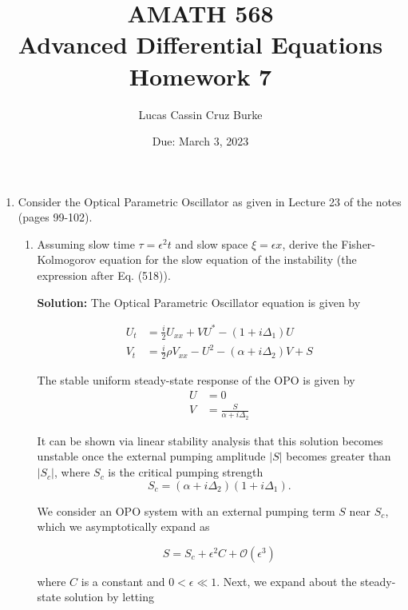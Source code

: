\documentclass[12pt, a4paper]{article}
\begin{document}
\title{{AMATH 568\\
Advanced Differential Equations}\\
{\bf \Huge Homework 7}}

\author{Lucas Cassin Cruz Burke}

\date{Due: March 3, 2023}

\maketitle

\begin{enumerate}
    \item Consider the Optical Parametric Oscillator as given in Lecture 23 of the notes (pages 99-102).
    
    \begin{enumerate}
        \item Assuming slow time $\tau = \epsilon^2 t$ and slow space $\xi = \epsilon x$, derive the Fisher-Kolmogorov equation for the slow equation of the instability (the expression after Eq. (518)). 
        
        \textbf{Solution:} The Optical Parametric Oscillator equation is given by 
        
        \begin{align*}
            U_t &= \frac{i}{2} U_{xx} + VU^* - (1+i \Delta_1)U \\ V_t &= \frac{i}{2} \rho V_{xx} - U^2 - (\alpha + i\Delta_2)V + S
        \end{align*}

        The stable uniform steady-state response of the OPO is given by
        \begin{align*}
            U &= 0 \\ V &= \frac{S}{\alpha + i\Delta_2}
        \end{align*}

        It can be shown via linear stability analysis that this solution becomes unstable once the external pumping amplitude $|S|$ becomes greater than $|S_c|$, where $S_c$ is the critical pumping strength $$S_c = (\alpha + i\Delta_2)(1+i\Delta_1).$$ 

        We consider an OPO system with an external pumping term $S$ near $S_c$, which we asymptotically expand as 

        $$S = S_c + \epsilon^2 C + \mathcal O(\epsilon^3)$$

        where $C$ is a constant and $0 < \epsilon \ll 1$. Next, we expand about the steady-state solution by letting 


\end{enumerate}
\end{enumerate}
\end{document}
